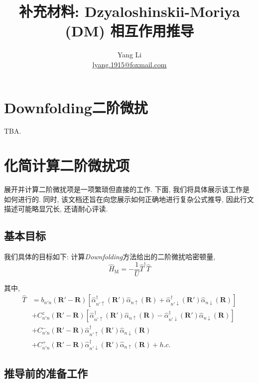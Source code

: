 \documentclass[a4paper, 12pt]{article}
\title{\textbf{补充材料: Dzyaloshinskii-Moriya (DM) 相互作用推导}}
\author{Yang Li\\ \href{mailto:lyang.1915@foxmail.com}{lyang.1915@foxmail.com}}
\begin{document}
\maketitle
\section{Downfolding二阶微扰}
TBA.

\section{化简计算二阶微扰项}
展开并计算二阶微扰项是一项繁琐但直接的工作. 下面, 我们将具体展示该工作是如何进行的. 同时, 该文档还旨在向您展示如何正确地进行复杂公式推导, 因此行文描述可能略显冗长, 还请耐心评读. 

\subsection{基本目标}
我们具体的目标如下: 计算\emph{Downfolding}方法给出的二阶微扰哈密顿量,
\begin{equation}
  \label{eq:HM}
  \widehat{H}_{\text{M}} = - \frac{1}{U} \widehat{T}^\dagger\widehat{T}
\end{equation}

其中, 
\begin{equation}
  \label{eq:T}
  \begin{aligned}
    \widehat{T} &= b_{n'n}(\bm{R}'-\bm{R})\left[\widehat{\alpha}_{n'\uparrow}^{\dagger}(\bm{R}')\widehat{\alpha}_{n\uparrow}(\bm{R}) + \widehat{\alpha}_{n'\downarrow}^{\dagger}(\bm{R}')\widehat{\alpha}_{n\downarrow}(\bm{R})\right]\\
    &+ C_{n'n}^{z}(\bm{R}'-\bm{R})\left[\widehat{\alpha}_{n'\uparrow}^{\dagger}(\bm{R}')\widehat{\alpha}_{n\uparrow}(\bm{R}) - \widehat{\alpha}_{n'\downarrow}^{\dagger}(\bm{R}')\widehat{\alpha}_{n\downarrow}(\bm{R})\right]\\
    &+ C_{n'n}^{-}(\bm{R}'-\bm{R})\widehat{\alpha}_{n'\uparrow}^{\dagger}(\bm{R}')\widehat{\alpha}_{n\downarrow}(\bm{R})\\
    &+ C_{n'n}^{+}(\bm{R}'-\bm{R})\widehat{\alpha}_{n'\downarrow}^{\dagger}(\bm{R}')\widehat{\alpha}_{n\uparrow}(\bm{R}) + h.c.
  \end{aligned}
\end{equation}


\subsection{推导前的准备工作}
\end{document}
